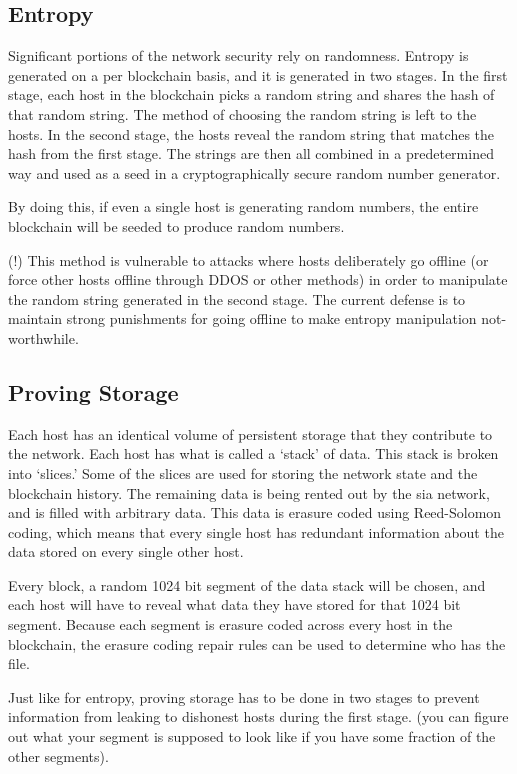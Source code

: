 \documentclass[a4paper,10pt]{article}
\begin{document}
\subsection{Entropy}
\par
	Significant portions of the network security rely on randomness. 
Entropy is generated on a per blockchain basis, and it is generated in two 
stages. In the first stage, each host in the blockchain picks a random string 
and shares the hash of that random string. The method of choosing the random 
string is left to the hosts. In the second stage, the hosts reveal the random 
string that matches the hash from the first stage. The strings are then all 
combined in a predetermined way and used as a seed in a cryptographically 
secure random number generator.
\par
	By doing this, if even a single host is generating random numbers, the 
entire blockchain will be seeded to produce random numbers.
\par
	(!) This method is vulnerable to attacks where hosts deliberately go 
offline (or force other hosts offline through DDOS or other methods) in order 
to manipulate the random string generated in the second stage. The current 
defense is to maintain strong punishments for going offline to make entropy 
manipulation not-worthwhile.
\subsection{Proving Storage}
\par
	Each host has an identical volume of persistent storage that they 
contribute to the network. Each host has what is called a ‘stack’ of data. This 
stack is broken into ‘slices.’ Some of the slices are used for storing the 
network state and the blockchain history. The remaining data is being rented 
out by the sia network, and is filled with arbitrary data. This data is erasure 
coded using Reed-Solomon coding, which means that every single host has 
redundant information about the data stored on every single other host.
\par
	Every block, a random 1024 bit segment of the data stack will be 
chosen, and each host will have to reveal what data they have stored for that 
1024 bit segment. Because each segment is erasure coded across every host in 
the blockchain, the erasure coding repair rules can be used to determine who 
has the file.
\par
	Just like for entropy, proving storage has to be done in two stages to 
prevent information from leaking to dishonest hosts during the first stage. 
(you can figure out what your segment is supposed to look like if you have some 
fraction of the other segments).
\end{document}
